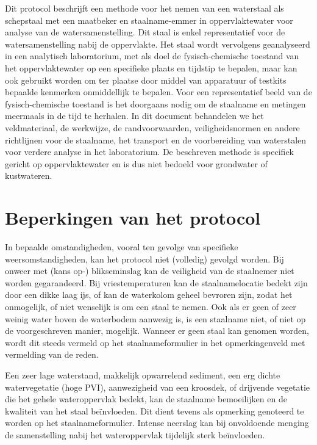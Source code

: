 \documentclass[
]{scrreprt}
\begin{document}
Dit protocol beschrijft een methode voor het nemen van een waterstaal als schepstaal met een maatbeker en staalname-emmer in oppervlaktewater voor analyse van de watersamenstelling. Dit staal is enkel representatief voor de watersamenstelling nabij de oppervlakte. Het staal wordt vervolgens geanalyseerd in een analytisch laboratorium, met als doel de fysisch-chemische toestand van het oppervlaktewater op een specifieke plaats en tijdstip te bepalen, maar kan ook gebruikt worden om ter plaatse door middel van apparatuur of testkits bepaalde kenmerken onmiddellijk te bepalen. Voor een representatief beeld van de fysisch-chemische toestand is het doorgaans nodig om de staalname en metingen meermaals in de tijd te herhalen. In dit document behandelen we het veldmateriaal, de werkwijze, de randvoorwaarden, veiligheidsnormen en andere richtlijnen voor de staalname, het transport en de voorbereiding van waterstalen voor verdere analyse in het laboratorium. De beschreven methode is specifiek gericht op oppervlaktewater en is dus niet bedoeld voor grondwater of kustwateren.

\chapter{Beperkingen van het protocol}\label{beperkingen-van-het-protocol}

In bepaalde omstandigheden, vooral ten gevolge van specifieke weersomstandigheden, kan het protocol niet (volledig) gevolgd worden. Bij onweer met (kans op-) blikseminslag kan de veiligheid van de staalnemer niet worden gegarandeerd. Bij vriestemperaturen kan de staalnamelocatie bedekt zijn door een dikke laag ijs, of kan de waterkolom geheel bevroren zijn, zodat het onmogelijk, of niet wenselijk is om een staal te nemen. Ook als er geen of zeer weinig water boven de waterbodem aanwezig is, is een staalname niet, of niet op de voorgeschreven manier, mogelijk. Wanneer er geen staal kan genomen worden, wordt dit steeds vermeld op het staalnameformulier in het opmerkingenveld met vermelding van de reden.

Een zeer lage waterstand, makkelijk opwarrelend sediment, een erg dichte watervegetatie (hoge PVI), aanwezigheid van een kroosdek, of drijvende vegetatie die het gehele wateroppervlak bedekt, kan de staalname bemoeilijken en de kwaliteit van het staal beïnvloeden. Dit dient tevens als opmerking genoteerd te worden op het staalnameformulier. Intense neerslag kan bij onvoldoende menging de samenstelling nabij het wateroppervlak tijdelijk sterk beïnvloeden.
\end{document}
